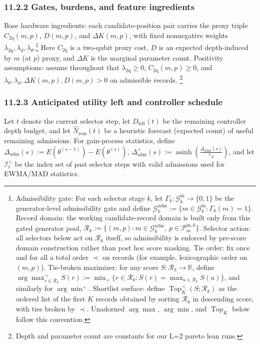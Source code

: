 \documentclass[11pt]{article}
\begin{document}
\subsubsection*{11.2.2 Gates, burdens, and feature ingredients}

Base hardware ingredients: each candidate-position pair carries the proxy triple \(C_{\mathrm{2q}}(m,p)\), \(D(m,p)\), and \(\Delta K(m,p)\), with fixed nonnegative weights \(\lambda_{\mathrm{2q}},\lambda_d,\lambda_\theta\).\footnote{Admissibility gate: For each selector stage \(k\), let \(\Gamma_k:\mathcal G_k^{\mathrm{in}}\to\{0,1\}\) be the generator-level admissibility gate and define \(\mathcal G_k^{\mathrm{adm}}:=\{m\in\mathcal G_k^{\mathrm{in}}:\Gamma_k(m)=1\}\). Record domain: the working candidate-record domain is built only from this gated generator pool, \(\mathcal R_k:=\{(m,p):m\in\mathcal G_k^{\mathrm{adm}},\ p\in\mathcal P_m^{\mathrm{in},k}\}\). Selector action: all selectors below act on \(\mathcal R_k\) itself, so admissibility is enforced by pre-score domain construction rather than post hoc score masking. Tie order: fix once and for all a total order \(\prec\) on records (for example, lexicographic order on \((m,p)\)). Tie-broken maximizer: for any score \(S:\mathcal R_k\to\mathbb R\), define \(\arg\max^{\prec}_{r\in\mathcal R_k} S(r):=\min_{\prec}\{r\in\mathcal R_k:S(r)=\max_{u\in\mathcal R_k}S(u)\}\), and similarly for \(\arg\min^{\prec}\). Shortlist surface: define \(\operatorname{Top}_K^{\prec}(S;\mathcal R_k)\) as the ordered list of the first \(K\) records obtained by sorting \(\mathcal R_k\) in descending score, with ties broken by \(\prec\). Unadorned \(\arg\max\), \(\arg\min\), and \(\operatorname{Top}_K\) below follow this convention.}
Here \(C_{\mathrm{2q}}\) is a two-qubit proxy cost, \(D\) is an expected depth-induced by \(m\) (at \(p\)) proxy, and \(\Delta K\) is the marginal parameter count. Positivity assumptions: assume throughout that \(\lambda_{\mathrm{2q}}\ge 0\), \(C_{\mathrm{2q}}(m,p)\ge 0\), and \(\lambda_\theta,\lambda_d,\Delta K(m,p),D(m,p)>0\) on admissible records. \footnote{Depth and parameter count are constants for our L=2 pareto lean runs.}

\subsubsection*{11.2.3 Anticipated utility left and controller schedule}
Let $t$ denote the current selector step, let $D_{\mathrm{left}}(t)$ be the remaining controller depth budget, and let $\widehat N_{\mathrm{rem}}(t)$ be a heuristic forecast (expected count) of useful remaining admissions. For gain-process statistics, define \(\Delta_{\mathrm{adm}}(s):=E(\theta^{(s-1)})-E(\theta^{(s)})\), \(\Delta_{\mathrm{adm}}^{+}(s):=\operatorname{asinh}\!\left(\frac{\Delta_{\mathrm{adm}}(s)}{\tau_\Delta}\right)\), and let \(\mathcal I_t^+\) be the index set of past selector steps with valid admissions used for EWMA/MAD statistics.
\end{document}
